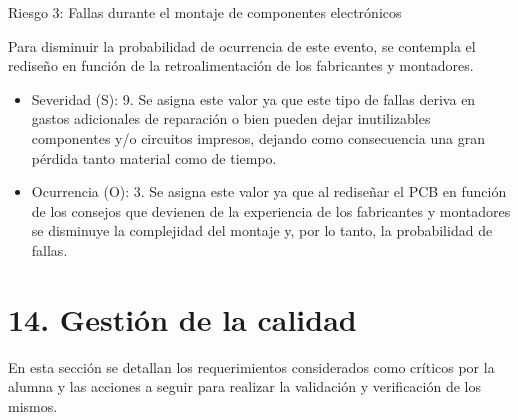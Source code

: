 \documentclass[
11pt, %
]{charter}
\begin{document}
Riesgo 3: Fallas durante el montaje de componentes electrónicos

Para disminuir la probabilidad de ocurrencia de este evento, se contempla el rediseño en función de la retroalimentación de los fabricantes y montadores.
\begin{itemize}
	\item Severidad (S): 9. Se asigna este valor ya que este tipo de fallas deriva en gastos adicionales de reparación o bien pueden dejar inutilizables componentes y/o circuitos impresos, dejando como consecuencia una gran pérdida tanto material como de tiempo.
	\item Ocurrencia (O): 3. Se asigna este valor ya que al rediseñar el PCB en función de los consejos que devienen de la experiencia de los fabricantes y montadores se disminuye la complejidad del montaje y, por lo tanto, la probabilidad de fallas.  
\end{itemize}



\newpage
\section{14. Gestión de la calidad}
\label{sec:calidad}

En esta sección se detallan los requerimientos considerados como críticos por la alumna y las acciones a seguir para realizar la validación y verificación de los mismos. 
\end{document}
